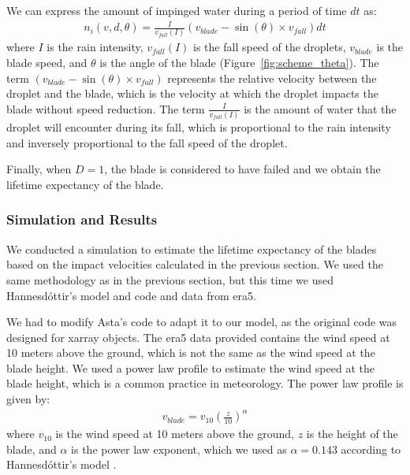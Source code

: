 \documentclass[10pt]{report}
\begin{document}
We can express the amount of impinged water during a period of time $dt$ as:
\begin{align}
    n_i(v,d,\theta) = \frac{I}{v_{fall}(I)} (v_{blade} - \sin(\theta)\times v_{fall}) dt
\end{align} 
where $I$ is the rain intensity, $v_{fall}(I)$ is the fall speed of the droplets, $v_{blade}$ is the blade speed, and $\theta$ is the angle of the blade (Figure~\ref{fig:scheme_theta}). The term $(v_{blade} - \sin(\theta)\times v_{fall})$ represents the relative velocity between the droplet and the blade, which is the velocity at which the droplet impacts the blade without speed reduction. The term $\frac{I}{v_{fall}(I)}$ is the amount of water that the droplet will encounter during its fall, which is proportional to the rain intensity and inversely proportional to the fall speed of the droplet.

Finally, when $D=1$, the blade is considered to have failed and we obtain the lifetime expectancy of the blade.

\subsubsection*{Simulation and Results}
We conducted a simulation to estimate the lifetime expectancy of the blades based on the impact velocities calculated in the previous section. We used the same methodology as in the previous section, but this time we used Hannesdóttir's model and code \cite{hannesdottir2024} and data from era5.
\par We had to modify Asta's code to adapt it to our model, as the original code was designed for xarray objects. The era5 data provided contains the wind speed at 10 meters above the ground, which is not the same as the wind speed at the blade height. We used a power law profile to estimate the wind speed at the blade height, which is a common practice in meteorology. The power law profile is given by:
\begin{align}
    v_{blade} = v_{10} \left(\frac{z}{10}\right)^{\alpha}
\end{align}
where \( v_{10} \) is the wind speed at 10 meters above the ground, \( z \) is the height of the blade, and \( \alpha \) is the power law exponent, which we used as \( \alpha = 0.143 \) according to Hannesdóttir's model \cite{hannesdottir2024}.
\end{document}
